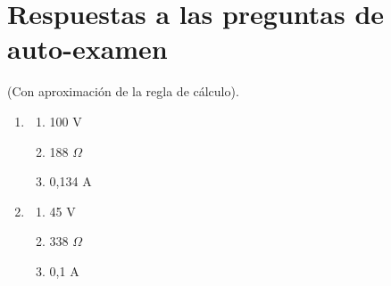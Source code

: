 \documentclass{article}
\begin{document}
\section*{Respuestas a las preguntas de auto-examen}

(Con aproximación de la regla de cálculo).

\begin{enumerate}
\item \begin{enumerate}
    \item 100 V
    \item 188 $\Omega$
    \item 0,134 A
    \end{enumerate}
\item \begin{enumerate}
    \item 45 V
    \item 338 $\Omega$
    \item 0,1 A
    \end{enumerate}
\end{enumerate}
\end{document}
